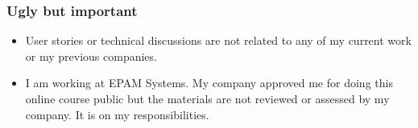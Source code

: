 %	
%			


\begin{frame}
\frametitle{Ugly but important}

\begin{itemize}[<+->]
	\item User stories or technical discussions are not related to any of my current work or my previous companies.
	\item I am working at EPAM Systems. My company approved me for doing this online course public but the materials are not reviewed or assessed by my company. It is on my responsibilities.
\end{itemize}
\end{frame}

